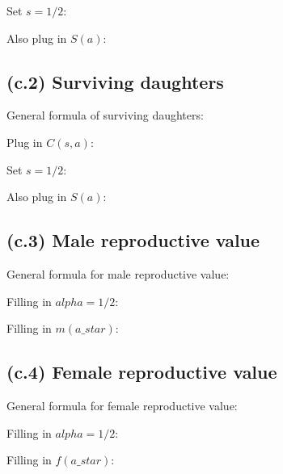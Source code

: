 \documentclass[11]{article}
\begin{document}
Set $s=1/2$:



Also plug in $S(a)$:



\subsection{(c.2) Surviving daughters}

General formula of surviving daughters:



Plug in $C(s,a)$:



Set $s=1/2$:



Also plug in $S(a)$:



\subsection{(c.3) Male reproductive value}

General formula for male reproductive value:



Filling in $alpha=1/2$:



Filling in $m(a\_star)$:



\subsection{(c.4) Female reproductive value}

General formula for female reproductive value:



Filling in $alpha=1/2$:



Filling in $f(a\_star)$:


\end{document}
